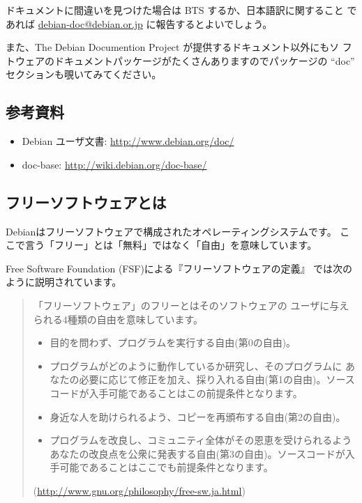 \documentclass[mingoth,a4paper]{jsarticle}
\begin{document}
ドキュメントに間違いを見つけた場合は BTS するか、日本語訳に関すること
であれば \url{debian-doc@debian.or.jp} に報告するとよいでしょう。

また、The Debian Documention Project が提供するドキュメント以外にもソ
フトウェアのドキュメントパッケージがたくさんありますのでパッケージの
``doc'' セクションも覗いてみてください。

\subsection{参考資料}
\begin{itemize}
 \item Debian ユーザ文書: \url{http://www.debian.org/doc/}
 \item doc-base: \url{http://wiki.debian.org/doc-base/}
\end{itemize}

\subsection{フリーソフトウェアとは}

Debianはフリーソフトウェアで構成されたオペレーティングシステムです。
ここで言う「フリー」とは「無料」ではなく「自由」を意味しています。

Free Software Foundation (FSF)による『フリーソフトウェアの定義』
では次のように説明されています。

\begin{quote}
「フリーソフトウェア」のフリーとはそのソフトウェアの
ユーザに与えられる4種類の自由を意味しています。

\begin{itemize}
 \item 目的を問わず、プログラムを実行する自由(第0の自由)。

 \item プログラムがどのように動作しているか研究し、そのプログラムに あなたの必要に応じて修正を加え、採り入れる自由(第1の自由)。ソースコードが入手可能であることはこの前提条件となります。

 \item 身近な人を助けられるよう、コピーを再頒布する自由(第2の自由)。

 \item プログラムを改良し、コミュニティ全体がその恩恵を受けられるよう あなたの改良点を公衆に発表する自由(第3の自由)。ソースコードが入手可能であることはここでも前提条件となります。

\end{itemize}

(\url{http://www.gnu.org/philosophy/free-sw.ja.html})
\end{quote}
\end{document}
